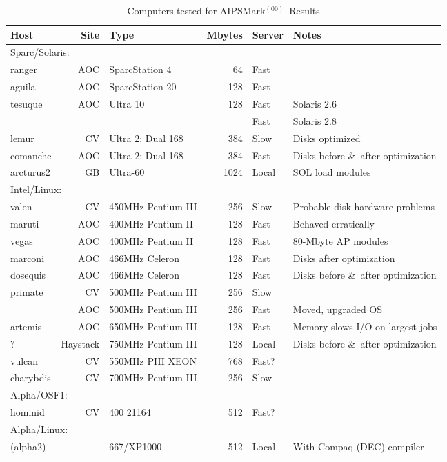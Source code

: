 \documentclass[twoside]{article}
\newcommand{\AMark}{AIPSMark$^{(00)}$}
\begin{document}
\begin{table}
\protect\begin{center}
\protect\begin{tabular}{|lr|lrl|l|} \hline
 Host    &Site&Type &Mbytes&Server&Notes \\
\hline
\multicolumn{5}{|l|}{Sparc/Solaris:}\\
\hline
ranger   &AOC &SparcStation 4       & 64  &Fast & \\
aguila   &AOC &SparcStation 20      & 128 &Fast & \\
tesuque  &AOC &Ultra 10             & 128 &Fast & Solaris 2.6 \\
         &    &                     &     &Fast & Solaris 2.8 \\
lemur    &CV  &Ultra 2: Dual 168    & 384 &Slow &Disks optimized \\
comanche &AOC &Ultra 2: Dual 168    & 384 &Fast &Disks before \&\ after optimization\\
arcturus2&GB  &Ultra-60             & 1024&Local&SOL load modules \\
\hline
\multicolumn{5}{|l|}{Intel/Linux:}\\
\hline
valen    &CV  &450MHz Pentium III   & 256 &Slow &Probable disk hardware problems \\
maruti   &AOC &400MHz Pentium II    & 128 &Fast &Behaved erratically \\
vegas    &AOC &400MHz Pentium II    & 128 &Fast &80-Mbyte AP modules \\
marconi  &AOC &466MHz Celeron       & 128 &Fast &Disks after optimization\\
dosequis &AOC &466MHz Celeron       & 128 &Fast &Disks before \&\ after optimization\\
primate  &CV  &500MHz Pentium III   & 256 &Slow & \\
         &AOC &500MHz Pentium III   & 256 &Fast &Moved, upgraded OS \\
artemis  &AOC &650MHz Pentium III   & 128 &Fast &Memory slows I/O on largest jobs\\
?    &Haystack&750MHz Pentium III   & 128 &Local&Disks before \&\ after optimization\\
vulcan   &CV  &550MHz PIII XEON     & 768 &Fast?& \\
charybdis&CV  &700MHz Pentium III   & 256 &Slow & \\
\hline
\multicolumn{5}{|l|}{Alpha/OSF1:}\\
\hline
hominid  &CV  &400 21164            & 512 &Fast?& \\
\hline
\multicolumn{5}{|l|}{Alpha/Linux:}\\
\hline
(alpha2) &    &667/XP1000           & 512 &Local&With Compaq (DEC) compiler\\
\hline
\end{tabular}
\end{center}
\caption{Computers tested for \AMark\ Results}
\label{ta:machines}
\end{table}
\end{document}

